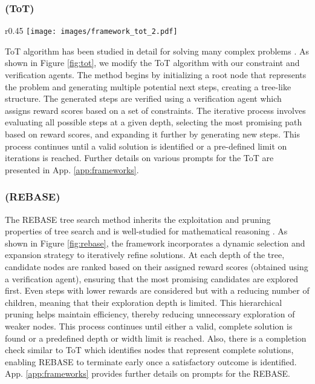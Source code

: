 \subsubsection{\plangen{} (ToT)}

\begin{wrapfigure}{r}{0.45\textwidth}
    \centering
    \vspace{-12mm}
    \texttt{[image: images/framework\_tot\_2.pdf]}
    \vspace{-3mm}
    \caption{Schematic representation of \plangen{} (ToT). Highest-reward steps are highlighted in green.}
    \label{fig:tot}
\end{wrapfigure}ToT algorithm has been studied in detail for solving many complex problems \citep{yao2024tree}. As shown in Figure \ref{fig:tot}, we modify the ToT algorithm with our constraint and verification agents. The method begins by initializing a root node that represents the problem and generating multiple potential next steps, creating a tree-like structure. The generated steps are verified using a verification agent which assigns reward scores based on a set of constraints. The iterative process involves evaluating all possible steps at a given depth, selecting the most promising path based on reward scores, and expanding it further by generating new steps. This process continues until a valid solution is identified or a pre-defined limit on iterations is reached. Further details on various prompts for the ToT are presented in App. \ref{app:frameworks}.


\subsubsection{\plangen{} (REBASE)}

The REBASE tree search method inherits the exploitation and pruning properties of tree search and is well-studied for mathematical reasoning \citep{wu2024empirical}. As shown in Figure \ref{fig:rebase}, the framework incorporates a dynamic selection and expansion strategy to iteratively refine solutions. At each depth of the tree, candidate nodes are ranked based on their assigned reward scores (obtained using a verification agent), ensuring that the most promising candidates are explored first. Even steps with lower rewards are considered but with a reducing number of children, meaning that their exploration depth is limited. This hierarchical pruning helps maintain efficiency, thereby reducing unnecessary exploration of weaker nodes. This process continues until either a valid, complete solution is found or a predefined depth or width limit is reached. Also, there is a completion check similar to ToT which identifies nodes that represent complete solutions, enabling REBASE to terminate early once a satisfactory outcome is identified. App. \ref{app:frameworks} provides further details on prompts for the REBASE.

